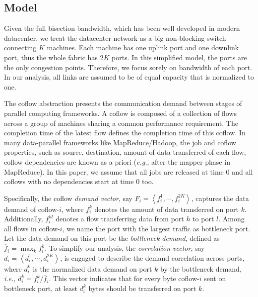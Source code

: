 \documentclass[10pt,journal,compsoc]{IEEEtran}
\begin{document}
\subsection{Model}
Given the full bisection bandwidth, which has been well developed in modern datacenter\cite{jupiter}, we treat the datacenter network as a big non-blocking switch connecting $K$ machines.
%
Each machine has one uplink port and one downlink port, thus the whole fabric has $2K$ ports.
%
In this simplified model, the ports are the only congestion points.
%
Therefore, we focus sorely on bandwidth of each port.
%
In our analysis, all links are assumed to be of equal capacity that is normalized to one.

The coflow abstraction presents the communication demand between stages of parallel computing frameworks.
%
A coflow is composed of a collection of flows across a group of machines sharing a common performance requirement.
%
The completion time of the latest flow defines the completion time of this coflow.
%
In many data-parallel frameworks like MapReduce/Hadoop, the job and coflow properties, such as source, destination, amount of data transferred of each flow, coflow dependencies are known as a priori (\emph{e.g.}, after the mapper phase in MapReduce)\cite{varys, aalo, bingchuan}.
%
In this paper, we assume that all jobs are released at time 0 and all coflows with no dependencies start at time 0 too.

Specifically, the coflow \emph{demand vector}, say $F_i = \left\langle f_i^1,\cdots,f_i^{2K}\right\rangle$, captures the data demand of coflow-$i$, where $f_i^k$ denotes the amount of data transferred on port $k$.
%
Additionally, $f_i^{hl}$ denotes a flow transferring data from port $h$ to port $l$.
%
Among all flows in coflow-$i$, we name the port with the largest traffic as bottleneck port.
%
Let the data demand on this port be the \emph{bottleneck demand}, defined as $\overline{f}_i=\max_{k} f_i^k$.
%
To simplify our analysis, the \emph{correlation vector}, say $d_i = \left\langle d_i^1,\cdots,d_i^{2K}\right\rangle$, is engaged to describe the demand correlation across ports, where $d_i^k$ is the normalized data demand on port $k$ by the bottleneck demand, \emph{i.e.}, $d_i^k = f_i^k/\overline{f}_i$.
%
This vector indicates that for every byte coflow-$i$ sent on bottleneck port, at least $d_i^k$ bytes should be transferred on port $k$.
\end{document}
